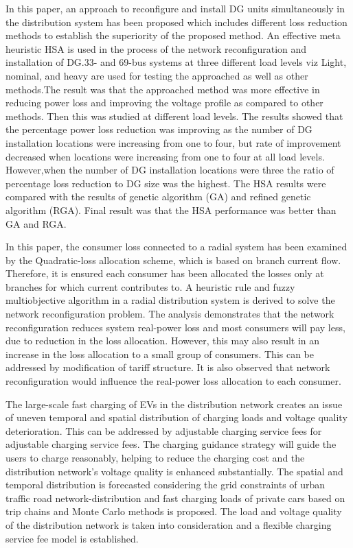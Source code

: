 	\noindent \cite{rao} In this paper, an approach to reconfigure and install DG units simultaneously in the distribution system has been proposed which includes different loss reduction methods to establish the superiority of the proposed method. An effective meta heuristic HSA is used in the process of the network reconfiguration and installation of DG.33- and 69-bus systems at three different load levels viz Light, nominal, and heavy are used for testing the approached as well as other methods.The result was that the approached method was more effective in reducing power loss and improving the voltage profile as compared to other methods. Then this  was studied at different load levels. The results showed that the percentage power loss reduction was improving as the number of DG installation locations were increasing from one to four, but rate of improvement decreased when locations were increasing from one to four at all load levels. However,when the number of DG installation locations were three the ratio of percentage loss reduction to DG size was the highest. The HSA results were compared with the results of genetic algorithm (GA) and refined genetic algorithm (RGA). Final result was that the HSA performance was better than GA and RGA.
	
	\noindent \cite{69bus} In this paper, the consumer loss connected to a radial system has been examined by the Quadratic-loss allocation scheme, which is based on branch current flow. Therefore, it is ensured each consumer has been allocated the losses only at branches for which current contributes to.  A heuristic rule and fuzzy multiobjective algorithm in a radial distribution system is derived to solve the network reconfiguration problem. The analysis demonstrates that the network reconfiguration reduces system real-power loss and most consumers will pay less, due to reduction in the loss allocation. However, this may also result in an increase in the loss allocation to a small group of consumers. This can be addressed by modification of tariff structure. It is also observed that network reconfiguration would influence the real-power loss allocation to each consumer.
	
	\noindent \cite{zhang2022fast} The large-scale fast charging of EVs in the distribution network creates an issue of uneven temporal and spatial distribution of charging loads and voltage quality deterioration.  This can be addressed by adjustable charging service fees for adjustable charging service fees. The charging guidance strategy will guide the users to charge reasonably, helping to reduce the charging cost and the distribution network’s voltage quality is enhanced substantially.
	The spatial and temporal distribution is forecasted considering the grid constraints of urban traffic road network-distribution and fast charging loads of private cars based on trip chains and Monte Carlo methods is proposed. The load and voltage quality of the distribution network is taken into consideration and a flexible charging service fee model is established. 
	

